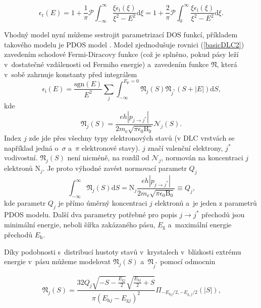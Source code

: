 \begin{equation}
\epsilon_\mathrm{r}(E) = 
1 + \frac{1}{\pi} \mathcal{P} \int_{-\infty}^\infty \frac{\xi \epsilon_\mathrm{i}(\xi)}{\xi^2 - E^2} \mathrm{d}\xi = 
1 + \frac{2}{\pi} \mathcal{P} \int_0^\infty \frac{\xi \epsilon_\mathrm{i}(\xi)}{\xi^2 - E^2} \mathrm{d}\xi 
\text{.}
\end{equation}


Vhodný model nyní můžeme sestrojit parametrizací DOS funkcí, příkladem takového modelu je PDOS model \cite{Franta2007}. Model zjednodušuje rovnici (\ref{basicDLC2}) zavedením schodové Fermi-Diracovy funkce (což je splněno, pokud pásy leží v~dostatečné vzdálenosti od Fermiho energie) a~zavedením funkce $\mathfrak{N}$, která v~sobě zahrnuje konstanty před integrálem 
\begin{equation}
\label{epsilonDOS}
\epsilon_\mathrm{i}(E) = \frac{\mathrm{sgn}(E)}{E^2} \sum_{j} \int_{-\infty}^{E_\mathrm{F} = 0} \mathfrak{N}_j(S) \mathfrak{N}_{j^*}(S + |E|)\mathrm{d}S \text{,}
\end{equation}
kde
\begin{equation}
\label{unormN}
\mathfrak{N}_j(S) = \frac{eh | p_{j \rightarrow j^*} |}{2 m_\mathrm{e} \sqrt{\pi \epsilon_0 \mathrm{B}_0}} \mathcal{N}_j(S) \text{.}
\end{equation}
Index $j$ zde jde přes všechny typy elektronových stavů (v DLC vrstvách se například jedná o~$\sigma$ a~$\pi$ elektronové stavy). $j$ značí valenční elektrony, $j^*$ vodivostní. $\mathfrak{N}_j(S)$ není nicméně, na rozdíl od $\mathcal{N}_j$, normován na koncentraci $j$ elektronů $\mathrm{N}_j$. Je proto výhodné zavést normovací parametr $Q_j$
\begin{equation}
\int_{-\infty}^\infty \mathfrak{N}_j(S) \mathrm{d}S = 
\mathrm{N}_j \frac{eh | p_{j \rightarrow j^*} |}{2 m_\mathrm{e} \sqrt{\pi \epsilon_0 \mathrm{B}_0}} \equiv
Q_j \text{,}
\end{equation}
kde parametr $Q_j$ je přímo úměrný koncentraci $j$ elektronů a~je jeden z parametrů PDOS modelu. Další dva parametry potřebné pro popis $j \rightarrow j^*$ přechodů jsou minimální energie, neboli šířka zakázaného pásu, $E_\mathrm{g}$ a~maximální energie přechodů $E_\mathrm{h}$. 

Díky podobnosti s~distribucí hustoty stavů v~krystalech v~blízkosti extrému energie v~pásu můžeme modelovat $\mathfrak{N}_j(S)$ a~$\mathfrak{N}_{j^*}$ pomocí odmocnin

\begin{equation}
\label{N1}
 \mathfrak{N}_j(S) = 
\frac{
		32Q_j 
		\sqrt{-S-\frac{E_{\mathrm{g}j}}{2}}
		\sqrt{\frac{E_{\mathrm{h}j}}{2}+S}
	}{
		\pi (E_{\mathrm{h}j} - E_{\mathrm{g}j})^2
	}
\Pi_{-E_{\mathrm{h}j}/2,-E_{\mathrm{g},j}/2}(|S|)
\text{,}
\end{equation}

